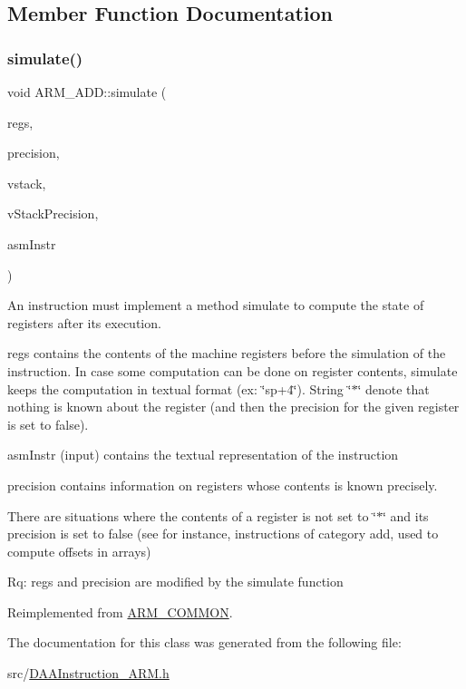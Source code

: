 \subsection{Member Function Documentation}
\mbox{\label{classARM__ADD_a8fd563bc37b1879fef93ee4ccbcfcafd}} 
\subsubsection{\texorpdfstring{simulate()}{simulate()}}
{\footnotesize\ttfamily void A\+R\+M\+\_\+\+A\+D\+D\+::simulate (\begin{DoxyParamCaption}\item[{\hyperlink{DAAInstruction_8h_af0fae93a861de9cf37988d5673cac523}{reg\+Table} \&}]{regs,  }\item[{\hyperlink{DAAInstruction_8h_a0e8cae02815a5f8adc750122d790b455}{reg\+Precision\+Table} \&}]{precision,  }\item[{\hyperlink{DAAInstruction_8h_a1b0e70ac1a04f06c8132055ed01f589f}{stack\+Type} \&}]{vstack,  }\item[{\hyperlink{DAAInstruction_8h_ac5cb793e9dac3fa9693da78b7e29ab30}{stack\+Prec\+Type} \&}]{v\+Stack\+Precision,  }\item[{const string \&}]{asm\+Instr }\end{DoxyParamCaption})\hspace{0.3cm}{\ttfamily [virtual]}}

An instruction must implement a method simulate to compute the state of registers after its execution.

regs contains the contents of the machine registers before the simulation of the instruction. In case some computation can be done on register contents, simulate keeps the computation in textual format (ex\+: \char`\"{}sp+4\char`\"{}). String \char`\"{}$\ast$\char`\"{} denote that nothing is known about the register (and then the precision for the given register is set to false).

asm\+Instr (input) contains the textual representation of the instruction

precision contains information on registers whose contents is known precisely.

There are situations where the contents of a register is not set to \char`\"{}$\ast$\char`\"{} and its precision is set to false (see for instance, instructions of category add, used to compute offsets in arrays)

Rq\+: regs and precision are modified by the simulate function 

Reimplemented from \hyperlink{classARM__COMMON_a89eb552311ce787557a976aee2fa2db6}{A\+R\+M\+\_\+\+C\+O\+M\+M\+ON}.



The documentation for this class was generated from the following file\+:\begin{DoxyCompactItemize}
\item 
src/\hyperlink{DAAInstruction__ARM_8h}{D\+A\+A\+Instruction\+\_\+\+A\+R\+M.\+h}\end{DoxyCompactItemize}
